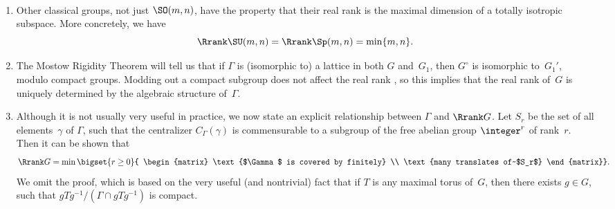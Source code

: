 \begin{rems} \label{RrankRems} \ 
\noprelistbreak
	\begin{enumerate}
	\item \label{RrankRems-Rrank(SUmn)}
	Other classical groups, not just $\SO(m,n)$, have the property that their real rank is the maximal dimension of a totally isotropic subspace.
More concretely, we have
 $$ %
 \Rrank \SU(m,n) = \Rrank \Sp(m,n) = \min\{m,n\} .$$
 
	\item 
	The Mostow Rigidity Theorem  will tell us that if $\Gamma$ is (isomorphic to) a lattice in both $G$ and~$G_1$, then $G^\circ$ is isomorphic to~$G_1'$, modulo compact groups. Modding out a compact subgroup does not affect the real rank , so this implies that the real rank of~$G$ is uniquely determined by the algebraic structure of~$\Gamma$.

\item \label{RrankRems-Rrank=CoverGamma}
Although it is not usually very useful in practice, we now state an explicit relationship between $\Gamma$ and $\Rrank G$. Let $S_r$ be the set of all elements~$\gamma$ of $\Gamma$, such that the centralizer $C_\Gamma(\gamma)$ is commensurable to a subgroup of the free abelian group $\integer^r$ of rank~$r$. Then it can be shown that
	$$ \Rrank G = \min \bigset{ r \ge 0 }{ \begin{matrix} \text{$\Gamma$ is covered by finitely} \\ \text{many translates of~$S_r$}  \end{matrix}} .$$
We omit the proof, which is based on the very useful (and nontrivial) fact that if $T$ is any maximal torus of~$G$, then there exists $g \in G$, such that $g T g^{-1} / (\Gamma \cap g T g^{-1})$ is compact.
\end{enumerate}
\end{rems}

